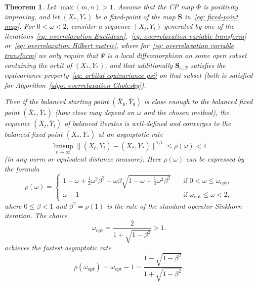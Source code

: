 \documentclass[a4paper]{article}
\newcommand{\bS}{\mathbf{S}}
\newtheorem{theorem}{Theorem}[section]
\theoremstyle{definition}
\numberwithin{equation}{section}
\begin{document}
\begin{theorem}\label{thm: local convergence}
Let $\max(m,n) > 1$. Assume that the CP map $\Phi$ is positivity improving, and let $(X_*,Y_*)$ be a fixed-point of the map $\bS$ in~\eqref{eq: fixed-point map}. For $0 < \omega < 2$, consider a sequence $(X_t,Y_t)$ generated by one of the iterations~\eqref{eq: overrelaxation Euclidean},~\eqref{eq: overrelaxation variable transform} or~\eqref{eq: overrelaxation Hilbert metric}, where for~\eqref{eq: overrelaxation variable transform} we only require that $\Psi$ is a \emph{local} diffeomorphism on some open subset containing the orbit of $(X_*, Y_*)$, and that additionally $\bS_{\omega,\Psi}$ satisfies the equivariance property~\eqref{eq: orbital equivariance psi} on that subset (both is satisfied for Algorithm~\ref{algo: overrelaxation Cholesky}).

Then if the balanced starting point $(\bar X_0,\bar Y_0)$ is close enough to the balanced fixed point $(\bar X_*,\bar Y_*)$ (how close may depend on $\omega$ and the chosen method), the sequence $(\bar X_t,\bar Y_t)$ of balanced iterates is well-defined and converges to the balanced fixed point $(\bar X_*,\bar Y_*)$ at an asymptotic rate
\[
 \limsup_{t \to \infty}  \| (\bar X_t,\bar Y_t) - (\bar X_*,\bar Y_*) \|^{1/t} \le \rho(\omega) < 1
\]
(in any norm or equivalent distance measure). Here $\rho(\omega)$ can be expressed by the formula
\[
 \rho(\omega) = \begin{cases} 1 - \omega  + \frac{1}{2} \omega^2 \beta^2 + \omega \beta \sqrt{1 - \omega + \frac14 \omega^2 \beta^2} &\quad \text{if $0 < \omega \le \omega_{\mathrm{opt}}$}, \\ \omega - 1 &\quad \text{if $\omega_{\mathrm{opt}} \le \omega < 2$}, \end{cases}
\]
where $0 \le \beta < 1$ and $\beta^2 = \rho(1)$ is the rate of the standard operator Sinkhorn iteration. The choice
\begin{equation}\label{eq:omega-opt}
 \omega_{\mathrm{opt}} = \frac{2}{1 + \sqrt{1- \beta^2}} > 1.
\end{equation}
achieves the fastest asymptotic rate
\[
 \rho(\omega_{\mathrm{opt}}) = \omega_{\mathrm{opt}} - 1 = \frac{1 - \sqrt{1-\beta^2}}{1 + \sqrt{1 - \beta^2}}.
\]
\end{theorem}
\end{document}
